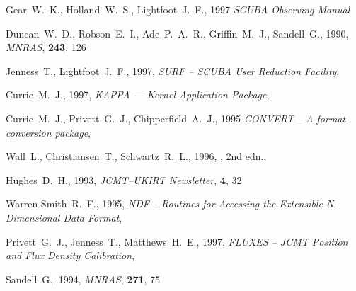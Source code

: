 \documentclass[twoside,11pt,fleqn,noabs]{starlink}
\begin{document}
\clearpage
\begin{thebibliography}{}

Gear~W.~K., Holland~W.~S., Lightfoot~J.~F., 1997
\textit{SCUBA Observing Manual}

Duncan~W.~D., Robson~E.~I., Ade~P.~A.~R., Griffin~M.~J., Sandell~G., 1990,
\textit{MNRAS}, \textbf{243}, 126

Jenness~T., Lightfoot~J.~F., 1997, \textit{SURF -- SCUBA User Reduction Facility},

Currie~M.~J., 1997, \textit{KAPPA --- Kernel Application Package},

Currie~M.~J., Privett~G.~J., Chipperfield~A.~J., 1995 \textit{CONVERT --
A format-conversion package}, 

Wall~L., Christiansen~T., Schwartz~R.~L., 1996,
, 2nd
edn., 

Hughes~D.~H., 1993, \textit{JCMT--UKIRT Newsletter}, \textbf{4}, 32

Warren-Smith~R.~F., 1995, \textit{NDF -- Routines for Accessing the Extensible
N-Dimensional Data Format}, 

Privett~G.~J., Jenness~T., Matthews~H.~E., 1997, \textit{FLUXES --
JCMT Position and Flux Density Calibration},

Sandell~G., 1994, \textit{MNRAS}, \textbf{271}, 75

\end{thebibliography}
\end{document}
